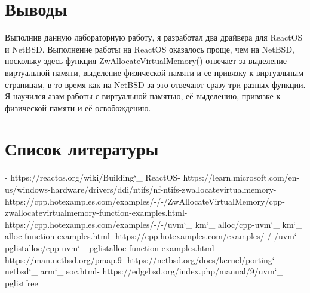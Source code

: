 \documentclass[a4paper, 14pt]{extarticle}
\begin{document}
\section{Выводы} \label{sec:Conclusion}
Выполнив данную лабораторную работу, я разработал два драйвера для ReactOS и NetBSD. Выполнение работы на ReactOS оказалось проще, чем на NetBSD, поскольку здесь функция ZwAllocateVirtualMemory() отвечает за выделение виртуальной памяти, выделение физической памяти и ее привязку к виртуальным страницам, в то время как на NetBSD за это отвечают сразу три разных функции. Я научился азам работы с виртуальной памятью, её выделению, привязке к физической памяти и её освобождению.
\pagebreak

\section{Список литературы} \label{sec:Literature}
\begin{flushleft}
[1] - https://reactos.org/wiki/Building\char`_ ReactOS\newline
[2] - https://learn.microsoft.com/en-us/windows-hardware/drivers/ddi/ntifs/nf-ntifs-zwallocatevirtualmemory\newline
[3] - https://cpp.hotexamples.com/examples/-/-/ZwAllocateVirtualMemory/cpp-zwallocatevirtualmemory-function-examples.html\newline
[4] - https://cpp.hotexamples.com/examples/-/-/uvm\char`_ km\char`_ alloc/cpp-uvm\char`_ km\char`_ alloc-function-examples.html\newline
[5] - https://cpp.hotexamples.com/examples/-/-/uvm\char`_ pglistalloc/cpp-uvm\char`_ pglistalloc-function-examples.html\newline
[6] - https://man.netbsd.org/pmap.9\newline
[7] - https://netbsd.org/docs/kernel/porting\char`_ netbsd\char`_ arm\char`_ soc.html\newline
[8] - https://edgebsd.org/index.php/manual/9/uvm\char`_ pglistfree
\end{flushleft}
\end{document}
